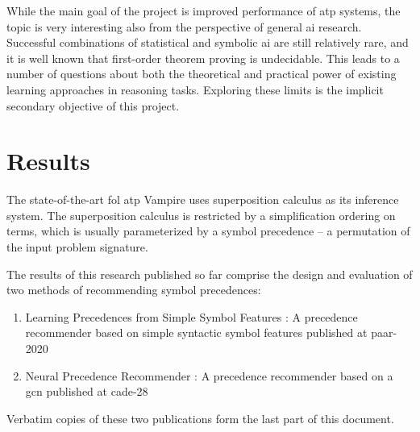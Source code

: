 \documentclass{article}
\begin{document}
While the main goal of the project is improved performance of \gls{atp} systems, the topic is very interesting also from the perspective of general \gls{ai} research. Successful combinations of statistical and symbolic \gls{ai} are still relatively rare, and it is well known that first-order theorem proving is undecidable. This leads to a number of questions about both the theoretical and practical power of existing learning approaches in reasoning tasks. Exploring these limits is the implicit secondary objective of this project.

\section{Results}

The state-of-the-art \gls{fol} \gls{atp} Vampire uses superposition calculus as its inference system.
The superposition calculus is restricted by a simplification ordering on terms,
which is usually parameterized by a symbol precedence -- a permutation of the input problem signature.

The results of this research published so far
comprise the design and evaluation of two methods of recommending symbol precedences:

\begin{enumerate}
\item Learning Precedences from Simple Symbol Features \cite{DBLP:conf/cade/Bartek020}:
A precedence recommender based on simple syntactic symbol features published at \gls{paar-2020}
\item Neural Precedence Recommender \cite{Bartek2021}:
A precedence recommender based on a \gls{gcn} published at \gls{cade-28}
\end{enumerate}

Verbatim copies of these two publications form the last part of this document.









\end{document}
